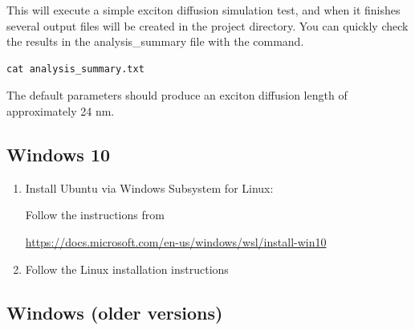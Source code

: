 \documentclass[%
 reprint,onecolumn,notitlepage,
superscriptaddress,longbibliography,
 amsmath,amssymb,
 aps,rmp,floatfix,
]{revtex4-1}
\begin{document}
\begin{enumerate}
This will execute a simple exciton diffusion simulation test, and when it finishes several output files will be created in the project directory.
You can quickly check the results in the analysis\_summary file with the command.
\begin{verbatim}
cat analysis_summary.txt
\end{verbatim}
The default parameters should produce an exciton diffusion length of approximately 24 nm.

\end{enumerate}

\subsection{Windows 10}

\begin{enumerate}
    \item Install Ubuntu via Windows Subsystem for Linux:
    
    Follow the instructions from
    
    \url{https://docs.microsoft.com/en-us/windows/wsl/install-win10}
    
    \item Follow the Linux installation instructions
\end{enumerate}

\subsection{Windows (older versions)}
\end{document}
